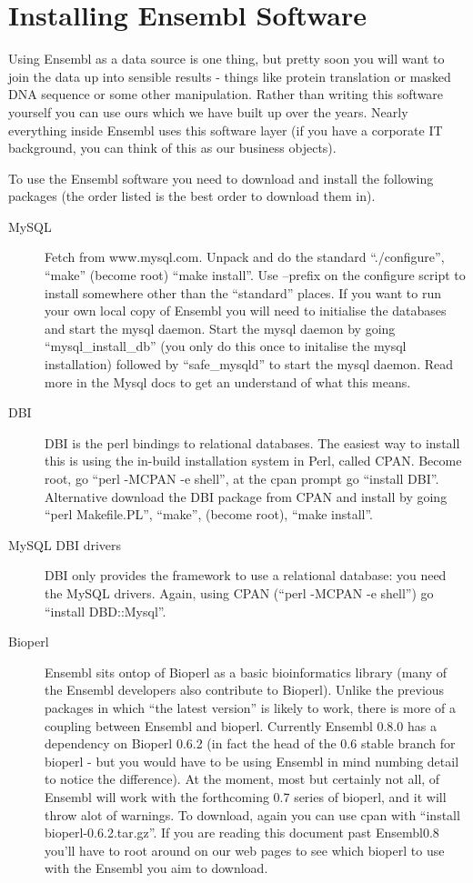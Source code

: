 \documentclass[11pt,a4paper]{article}
\begin{document}
\section{Installing Ensembl Software}

Using Ensembl as a data source is one thing, but pretty soon you will
want to join the data up into sensible results - things like protein
translation or masked DNA sequence or some other manipulation. Rather
than writing this software yourself you can use ours which we have
built up over the years.  Nearly everything inside Ensembl uses this
software layer (if you have a corporate IT background, you can think
of this as our business objects).


To use the Ensembl software you need to download and install the
following packages (the order listed is the best order to download
them in).
\label{standard_install}

\begin{description}
\item[MySQL] Fetch from www.mysql.com. Unpack and do the standard
``./configure'', ``make'' (become root) ``make install''. Use --prefix
on the configure script to install somewhere other than the
``standard'' places. If you want to run your own local copy of Ensembl
you will need to initialise the databases and start the mysql
daemon. Start the mysql daemon by going ``mysql\_install\_db'' (you
only do this once to initalise the mysql installation) followed by
``safe\_mysqld'' to start the mysql daemon. Read more in the Mysql
docs to get an understand of what this means.
\item[DBI] DBI is the perl bindings to relational databases. The easiest way to install
this is using the in-build installation system in Perl, called
CPAN. Become root, go ``perl -MCPAN -e shell'', at the cpan prompt go ``install DBI''.
Alternative download the DBI package from CPAN and install by going ``perl Makefile.PL'',
``make'', (become root), ``make install''.
\item[MySQL DBI drivers] DBI only provides the framework to use a relational database:
you need the MySQL drivers. Again, using CPAN (``perl -MCPAN -e shell'') go ``install DBD::Mysql''.
\item[Bioperl] Ensembl sits ontop of Bioperl as a basic bioinformatics library (many of the
Ensembl developers also contribute to Bioperl). Unlike the previous
packages in which ``the latest version'' is likely to work, there is
more of a coupling between Ensembl and bioperl. Currently Ensembl
0.8.0 has a dependency on Bioperl 0.6.2 (in fact the head of the 0.6
stable branch for bioperl - but you would have to be using Ensembl in
mind numbing detail to notice the difference).  At the moment, most
but certainly not all, of Ensembl will work with the forthcoming 0.7
series of bioperl, and it will throw alot of warnings. To download, again you can
use cpan with ``install bioperl-0.6.2.tar.gz''. If you are reading this document past Ensembl0.8
you'll have to root around on our web pages to see which bioperl to use with the Ensembl you aim
to download.
\end{description}
\end{document}
